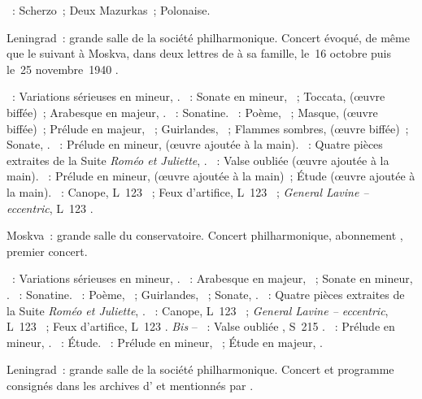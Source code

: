 \begin{description}
 \textsc{\Chopin{}}~: Scherzo~; Deux Mazurkas~; Polonaise.
 \item[\DateWithWeekDay{1940-10-30}]
 Leningrad~: grande salle de la société philharmonique.
 Concert évoqué, de même que le suivant à Moskva, dans deux lettres de
 \VSofronitsky{} à sa famille, le~16 octobre puis le~25 novembre~1940
 \citep[p.~29 et~30]{Kogan08}.

 \textsc{\Mendelssohn{}}~: Variations sérieuses en \kD mineur, .
 \textsc{\Schumann{}}~: Sonate en \kF mineur, ~; Toccata,
  (œuvre biffée)~; Arabesque en \kC majeur, .
 \textsc{\Ravel{}}~: Sonatine.
 \textsc{\Scriabine{}}~: Poème,  ~; Masque, 
  (œuvre biffée)~; Prélude en \kD \Flat majeur, 
 ~; Guirlandes,  ~; Flammes sombres, 
  (œuvre biffée)~; Sonate, .
 \textsc{\Rachmaninov{}}~: Prélude en \kC \Sharp mineur, 
  (œuvre ajoutée à la main).
 \textsc{\Prokofiev{}}~: Quatre pièces extraites de la Suite \emph{Roméo et
 Juliette}, .
 \textsc{\Liszt{}}~: Valse oubliée (œuvre ajoutée à la main).
 \textsc{\Chopin{}}~: Prélude en \kC \Sharp mineur,  
 (œuvre ajoutée à la main)~; Étude  (œuvre ajoutée à la main).
 \textsc{\Debussy{}}~: Canope, L~123 ~; Feux d'artifice, L~123
 ~; \emph{General Lavine -- eccentric}, L~123 .
 \item[\DateWithWeekDay{1940-11-02}]
 Moskva~: grande salle du conservatoire.
 Concert philharmonique, abonnement , premier concert.

 \textsc{\Mendelssohn{}}~: Variations sérieuses en \kD mineur, .
 \textsc{\Schumann{}}~: Arabesque en \kC majeur, ~; Sonate en \kF
 mineur, .
 \textsc{\Ravel{}}~: Sonatine.
 \textsc{\Scriabine{}}~: Poème,  ~; Guirlandes, 
 ~; Sonate, .
 \textsc{\Prokofiev{}}~: Quatre pièces extraites de la Suite \emph{Roméo et
 Juliette}, .
 \textsc{\Debussy{}}~: Canope, L~123 ~; \emph{General Lavine --
 eccentric}, L~123 ~; Feux d'artifice, L~123 .
 \emph{Bis} -- \textsc{\Liszt{}}~: Valse oubliée , S~215
 .
 \textsc{\Rachmaninov{}}~: Prélude en \kC \Sharp mineur, 
 .
 \textsc{\Chopin{}}~: Étude.
 \textsc{\Scriabine{}}~: Prélude en \kC \Sharp mineur, 
 ~; Étude en \kD \Flat majeur,  .
 \item[\DateWithWeekDay{1940-11-24}]
 Leningrad~: grande salle de la société philharmonique.
 Concert et programme consignés dans les archives d'\AVizel{} et mentionnés
 par \citet[p.~162]{Nekrasova08}.


\end{description}
